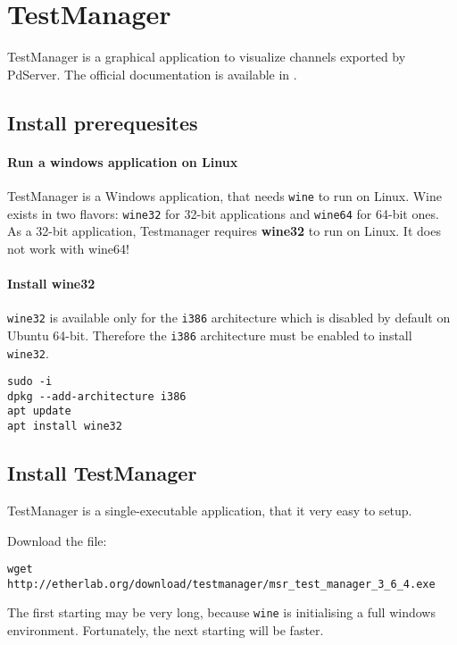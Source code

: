\chapter{TestManager}

TestManager is a graphical application to visualize channels exported
by PdServer. The official documentation is available in
\cite{testmanager_user_manual}.


\section{Install prerequesites}

\subsubsection{Run a windows application on Linux}
TestManager is a Windows application, that needs \texttt{wine} to run
on Linux.  Wine exists in two flavors: \texttt{wine32} for 32-bit
applications and \texttt{wine64} for 64-bit ones.  As a 32-bit
application, Testmanager requires \textbf{wine32} to run on Linux. It
does not work with wine64!


\subsubsection{Install wine32}
\texttt{wine32} is available only for the \texttt{i386} architecture
which is disabled by default on Ubuntu 64-bit.
Therefore the \texttt{i386} architecture must be enabled to install
\texttt{wine32}.

\begin{verbatim}
sudo -i
dpkg --add-architecture i386
apt update
apt install wine32
\end{verbatim}


\section{Install TestManager}

TestManager is a single-executable application, that it very easy to setup.

\noindent Download the file:

\begin{verbatim}
wget http://etherlab.org/download/testmanager/msr_test_manager_3_6_4.exe
\end{verbatim}

The first starting may be very long, because \texttt{wine} is
initialising a full windows environment. Fortunately, the next
starting will be faster.


